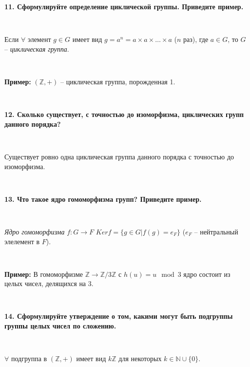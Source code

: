 \documentclass{article}
\begin{document}
    \textbf{11. Сформулируйте определение циклической группы. Приведите пример.}

    {
        $\;$
        \setlength{\parindent}{0.4cm}
        \hangindent=0.4cm

    Если $\forall$ элемент $g\in G$ имеет вид $g=a^n=a\times a\times\ldots\times a$ ($n$ раз), где $a\in G$, то $G$ -- \textit{циклическая группа}.

        $\;$

        \textbf{Пример:} $(\mathbb{Z}, +)$ -- циклическая группа, порожденная 1.

        $\;$
        \setlength{\parindent}{0cm}
        \hangindent=0cm
    }

    \textbf{12. Сколько существует, с точностью до изоморфизма, циклических групп данного порядка?}

    {
        $\;$
        \setlength{\parindent}{0.4cm}
        \hangindent=0.4cm

    Существует ровно одна циклическая группа данного порядка с точностью до изоморфизма.

        $\;$
        \setlength{\parindent}{0cm}
        \hangindent=0cm
    }

    \textbf{13. Что такое ядро гомоморфизма групп? Приведите пример.}

    {
        $\;$
        \setlength{\parindent}{0.4cm}
        \hangindent=0.4cm


    \textit{Ядро гомоморфизма} $f:G\rightarrow F$ $Ker f=\{g\in G|f(g)=e_F \}$ ($e_F$ -- нейтральный элелемент в $F$).

        $\;$

        \textbf{Пример:} В гомоморфизме $\mathbb{Z}\rightarrow\mathbb{Z}/3\mathbb{Z}$ с $h(u)=u \mod 3$ ядро состоит из целых чисел, делящихся на 3.

        $\;$
        \setlength{\parindent}{0cm}
        \hangindent=0cm
    }

    \newpage

    \textbf{14. Сформулируйте утверждение о том, какими могут быть подгруппы группы целых чисел по сложению.}

    {
        $\;$
        \setlength{\parindent}{0.4cm}
        \hangindent=0.4cm

        $\forall$ подгруппа в $(\mathbb{Z}, +)$ имеет вид $k\mathbb{Z}$ для некоторых $k\in \mathbb{N}\cup\{0\}$.

        $\;$
        \setlength{\parindent}{0cm}
        \hangindent=0cm
    }
\end{document}
